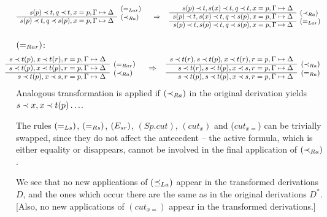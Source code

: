 \begin{PROOF}
\begin{LS}
\[{\begin{array}{rl}
s(p)\Incl t, q\Incl t, x=p, \GSD & \rabove{(=_{Lar})} \\ \cline{1-1}
s(p)\Incl t, q\Incl s(p), x=p, \GSD & \rabove{\iRa} \end{array} \conv
\begin{array}{rl}
s(p)\Incl t,s(x)\Incl t, q\Incl t, x=p, \GSD \\ \cline{1-1}
s(p)\Incl t,s(x)\Incl t, q\Incl s(p), x=p, \GSD & \rabove{\iRa} \\ \cline{1-1}
s(p)\Incl t,s(p)\Incl t, q\Incl s(p), x=p, \GSD & \rabove{(=_{Lar})} \end{array}
}
\]
\item $(=_{Rar})$:
\[ \sma{ \begin{array}{rl}
s\Incl t(p), x\Incl t(r), r=p, \GSD \\ \cline{1-1}
s\Incl t(p), x\Incl t(p), r=p, \GSD & \rabove{(=_{Rar})}\\ \cline{1-1}
s\Incl t(p), x\Incl s, r=p, \GSD & \rabove{\iRa} \end{array} \conv
 \begin{array}{rl}
s\Incl t(r), s\Incl t(p), x\Incl t(r), r=p, \GSD \\ \cline{1-1}
s\Incl t(r), s\Incl t(p), x\Incl s, r=p, \GSD & \rabove{\iRa} \\ \cline{1-1}
s\Incl t(p), s\Incl t(p), x\Incl s, r=p, \GSD & \rabove{\eRa} \end{array} 
} \]
Analogous transformation is applied if $(\mathbin{\prec}_{Ra})$ in the original derivation yields
$s\mathbin{\prec} x, x\mathbin{\prec} t(p)\ldots$.
%
\item The rules $(=_{Ls})$, $(=_{Rs})$, $(E_{sr})$, $(Sp.cut)$, $(cut_x)$ and ($cut_{x=}$) 
can be trivially swapped, since they do
not affect the antecedent -- the active formula, which is either equality or
disappears, cannot be involved in the final application of $(\mathbin{\prec}_{Ra})$.
\end{LS}
We see that no new applications of $(\preceq_{La})$ appear in the transformed derivations 
$D$, and the ones which occur there are the same as in the original 
derivations $D^*$.
[Also, no new applications of $(cut_{x=})$ appear in the transformed derivations.]
\end{PROOF}
%

